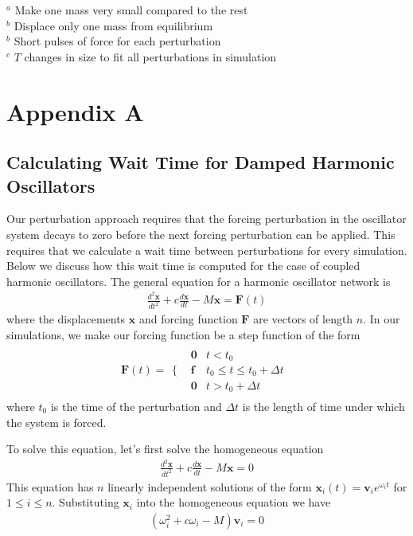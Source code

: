 \documentclass[]{article}
\begin{document}
\begin{table}
\footnotesize{
$^a$ Make one mass very small compared to the rest\\
$^b$ Displace only one mass from equilibrium\\
$^b$ Short pulses of force for each perturbation\\
$^c$ $T$ changes in size to fit all perturbations in simulation
}
\end{table}


\clearpage
\section{Appendix A}
\subsection{Calculating Wait Time for Damped Harmonic Oscillators}
Our perturbation approach requires that the forcing perturbation in the oscillator system decays to zero before the next forcing perturbation can be applied. This requires that we calculate a wait time between perturbations for every simulation. Below we discuss how this wait time is computed for the case of coupled harmonic oscillators. The general equation for a harmonic oscillator network is
\begin{align*}
\frac{d^2\mathbf{x}}{dt^2} + c\frac{d\mathbf{x}}{dt} - M\mathbf{x} = \mathbf{F}(t)
\end{align*}
where the displacements $\mathbf{x}$ and forcing function $\mathbf{F}$ are vectors of length $n$. In our simulations, we make our forcing function be a step function of the form
\begin{align*}
\mathbf{F}(t) = \begin{array}{cc}
  \Big\{ & 
    \begin{array}{cc}
      \mathbf{0} & t < t_0 \\
      \mathbf{f}  & t_0 \leq t \leq t_0 + \Delta t \\
      \mathbf{0} & t > t_0 + \Delta t
    \end{array}
\end{array}
\end{align*}
where $t_0$ is the time of the perturbation and $\Delta t$ is the length of time under which the system is forced.

To solve this equation, let's first solve the homogeneous equation
\begin{align*}
\frac{d^2\mathbf{x}}{dt^2} + c\frac{d\mathbf{x}}{dt} - M\mathbf{x} = 0
\end{align*}
This equation has $n$ linearly independent solutions of the form $\mathbf{x}_i(t) = \mathbf{v}_ie^{\omega_i t}$ for $1 \leq i \leq n$. Substituting $\mathbf{x}_i$ into the homogeneous equation we have
\begin{align*}
(\omega_i^2 + c\omega_i - M)\mathbf{v}_i = 0
\end{align*}
\end{document}
